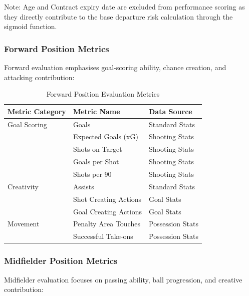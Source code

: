 Note: Age and Contract expiry date are excluded from performance scoring as they directly contribute to the base departure risk calculation through the sigmoid function.

\subsubsection{Forward Position Metrics}

Forward evaluation emphasises goal-scoring ability, chance creation, and attacking contribution:

\begin{table}[H]
\centering
\caption{Forward Position Evaluation Metrics}
\label{tab:forward_metrics}
\begin{tabular}{lll}
\toprule
\textbf{Metric Category} & \textbf{Metric Name} & \textbf{Data Source} \\
\midrule
Goal Scoring & Goals & Standard Stats \\
 & Expected Goals (xG) & Shooting Stats \\
 & Shots on Target & Shooting Stats \\
 & Goals per Shot & Shooting Stats \\
 & Shots per 90 & Shooting Stats \\
Creativity & Assists & Standard Stats \\
 & Shot Creating Actions & Goal Stats \\
 & Goal Creating Actions & Goal Stats \\
Movement & Penalty Area Touches & Possession Stats \\
 & Successful Take-ons & Possession Stats \\
\bottomrule
\end{tabular}
\end{table}

\subsubsection{Midfielder Position Metrics}

Midfielder evaluation focuses on passing ability, ball progression, and creative contribution:

